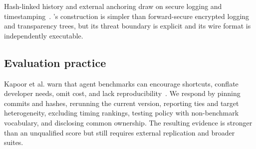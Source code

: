 Hash-linked history and external anchoring draw on secure logging and timestamping~\cite{schneier1998securelogs,haber1991timestamp}. \system's construction is simpler than forward-secure encrypted logging and transparency trees, but its threat boundary is explicit and its wire format is independently executable.

\subsection{Evaluation practice}

Kapoor et al. warn that agent benchmarks can encourage shortcuts, conflate developer needs, omit cost, and lack reproducibility~\cite{kapoor2024agents}. We respond by pinning commits and hashes, rerunning the current version, reporting ties and target heterogeneity, excluding timing rankings, testing policy with non-benchmark vocabulary, and disclosing common ownership. The resulting evidence is stronger than an unqualified score but still requires external replication and broader suites.
